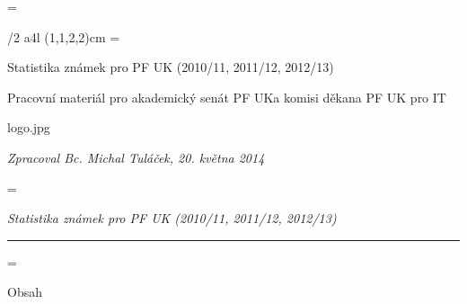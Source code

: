 \newtoks\headname \headname={}

\def\headrule{\leaders\hrule height3pt depth-2.6pt\hfil}

\margins/2 a4l (1,1,2,2)cm
\footline={}

\vfil
\tit Statistika známek pro PF UK (2010/11, 2011/12, 2012/13)

\vfil

\tit Pracovní materiál pro akademický senát PF UK\nl a komisi děkana PF UK pro IT

\vfil

\hsize \centerline{\inspic logo.jpg }
\vfil
\hfill {\em Zpracoval Bc. Michal Tuláček, 20. května 2014}
\eject

\headline={{\it Statistika známek pro PF UK (2010/11, 2011/12, 2012/13)\kern0.5cm \headrule\kern0.5cm \the\headname}}
\footline={\hss\tenrm\thefontsize[10]\the\pageno\hss}



\vfill
\eject

\nonum\notoc\chap Obsah

\hyperlinks{\Blue}{\Green}

\maketoc
\endmulti




\bye
